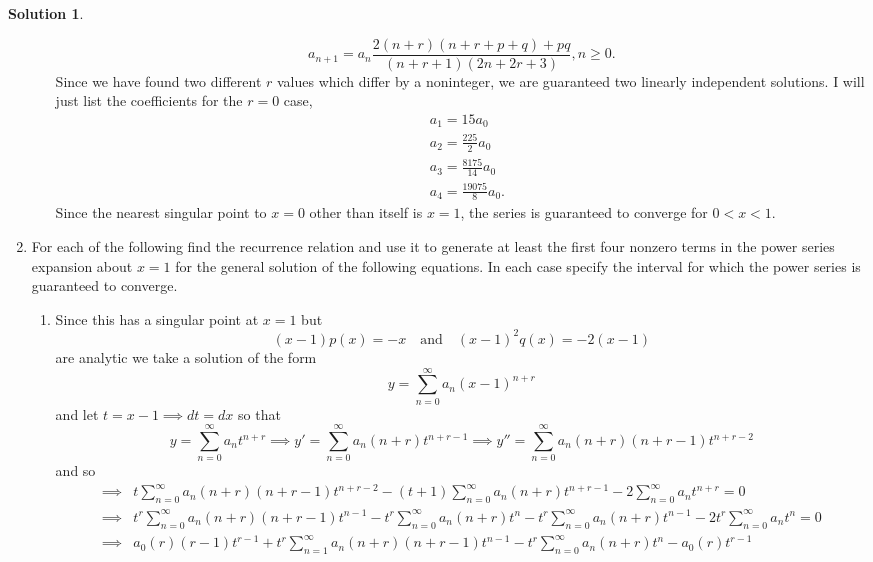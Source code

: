 \documentclass[10pt]{article}
\theoremstyle{definition}
\newtheorem{soln}{Solution}
\begin{document}
\begin{soln}
\begin{enumerate}[label=(\alph*)]
\begin{enumerate}[label=\roman*.]
                  $$a_{n+1} = a_n\frac{2(n+r)(n+r+p+q) + pq}{(n+r+1)(2n+2r+3)},n\geq 0.$$
                  Since we have found two different $r$ values which differ by a noninteger, we are guaranteed two linearly independent solutions. I will just list the coefficients
                  for the $r=0$ case,
                  \begin{align*}
                     & a_1=15a_0               \\
                     & a_2=\frac{225}{2}a_0    \\
                     & a_3=\frac{8175}{14}a_0  \\
                     & a_4=\frac{19075}{8}a_0.
                  \end{align*}
                  Since the nearest singular point to $x=0$ other than itself is $x=1$, the series is guaranteed to converge for $0<x<1$.
          \end{enumerate}
    \item For each of the following find the recurrence relation and use it to generate at least the first
          four nonzero terms in the power series expansion about $x = 1$ for the general solution of the
          following equations. In each case specify the interval for which the power series is guaranteed
          to converge.
          \begin{enumerate}[label=\roman*.]
            \item Since this has a singular point at $x=1$ but
                  $$(x-1)p(x)=-x\quad\text{and}\quad (x-1)^2q(x)=-2(x-1)$$
                  are analytic we take a solution of the form
                  $$y=\sum_{n=0}^{\infty}a_n(x-1)^{n+r}$$
                  and let $t=x-1\implies dt=dx$ so that
                  $$y=\sum_{n=0}^{\infty}a_n t^{n+r}\implies y'=\sum_{n=0}^{\infty}a_n(n+r) t^{n+r-1}\implies y''=\sum_{n=0}^{\infty}a_n(n+r)(n+r-1) t^{n+r-2}$$
                  and so
                  \begin{align*}
                    \implies & t \sum_{n=0}^{\infty}a_n(n+r)(n+r-1) t^{n+r-2} - (t+1)\sum_{n=0}^{\infty}a_n(n+r) t^{n+r-1} - 2\sum_{n=0}^{\infty}a_n t^{n+r} = 0                                  \\
                    \implies & t^r\sum_{n=0}^{\infty}a_n(n+r)(n+r-1) t^{n-1} - t^r\sum_{n=0}^{\infty}a_n(n+r) t^{n}-t^r\sum_{n=0}^{\infty}a_n(n+r) t^{n-1} - 2t^r\sum_{n=0}^{\infty}a_n t^{n} = 0 \\
                    \implies & a_0(r)(r-1) t^{r-1}+t^r\sum_{n=1}^{\infty}a_n(n+r)(n+r-1) t^{n-1} - t^r\sum_{n=0}^{\infty}a_n(n+r) t^{n}-a_0(r) t^{r-1}                                            \\

\end{align*}
\end{enumerate}
\end{enumerate}
\end{soln}
\end{document}
